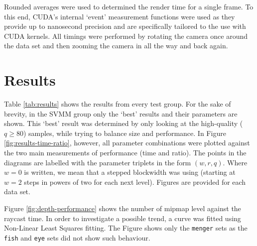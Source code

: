 Rounded averages were used to determined the render time for a single frame. To this end, CUDA's internal `event' measurement functions were used as they provide up to nanosecond precision and are specifically tailored to the use with CUDA kernels. All timings were performed by rotating the camera once around the data set and then zooming the camera in all the way and back again. 
%
\section{Results}
%
Table \ref{tab:results} shows the results from every test group. For the sake of brevity, in the SVMM group only the `best' results and their parameters are shown. This `best' result was determined by only looking at the high-quality ($q \geq 80$) samples, while trying to balance size and performance. In Figure \ref{fig:results-time-ratio}, however, all parameter combinations were plotted against the two main measurements of performance (time and ratio). The points in the diagrams are labelled with the parameter triplets in the form $(w,r,q)$. Where $w=0$ is written, we mean that a stepped blockwidth was using (starting at $w=2$ steps in powers of two for each next level). Figures are provided for each data set.

Figure \ref{fig:depth-performance} shows the number of mipmap level against the raycast time. In order to investigate a possible trend, a curve was fitted using Non-Linear Least Squares fitting. The Figure shows only the \texttt{menger} sets as the \texttt{fish} and \texttt{eye} sets did not show such behaviour.

